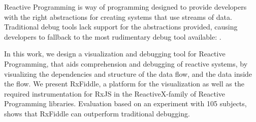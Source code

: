 Reactive Programming is way of programming designed to provide developers with the right abstractions for creating systems that use streams of data.
Traditional debug tools lack support for the abstractions provided, causing developers to fallback to the most rudimentary debug tool available: \printfdebugging{}.

In this work, we design a visualization and debugging tool for Reactive Programming, that aids comprehension and debugging of reactive systems, by visualizing the dependencies and structure of the data flow, and the data inside the flow.
We present RxFiddle, a platform for the visualization as well as the required instrumentation for RxJS in the ReactiveX-family of Reactive Programming libraries.
Evaluation based on an experiment with 105 subjects, shows that RxFiddle can outperform traditional debugging.

